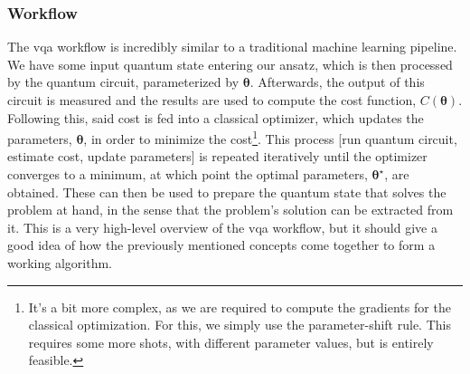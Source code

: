 \subsubsection*{\small Workflow}
The \acrshort{vqa} workflow is incredibly similar to a traditional machine learning pipeline. We have some input quantum state entering our ansatz, which is then processed by the quantum circuit, parameterized by $\boldsymbol{\theta}$. Afterwards, the output of this circuit is measured and the results are used to compute the cost function, $C(\boldsymbol{\theta})$. Following this, said cost is fed into a classical optimizer, which updates the parameters, $\boldsymbol{\theta}$, in order to minimize the cost\footnote{It's a bit more complex, as we are required to compute the gradients for the classical optimization. For this, we simply use the parameter-shift rule. This requires some more shots, with different parameter values, but is entirely feasible.}. This process [run quantum circuit, estimate cost, update parameters] is repeated iteratively until the optimizer converges to a minimum, at which point the optimal parameters, $\boldsymbol{\theta}^{\star}$, are obtained. These can then be used to prepare the quantum state that solves the problem at hand, in the sense that the problem's solution can be extracted from it. This is a very high-level overview of the \acrshort{vqa} workflow, but it should give a good idea of how the previously mentioned concepts come together to form a working algorithm.

